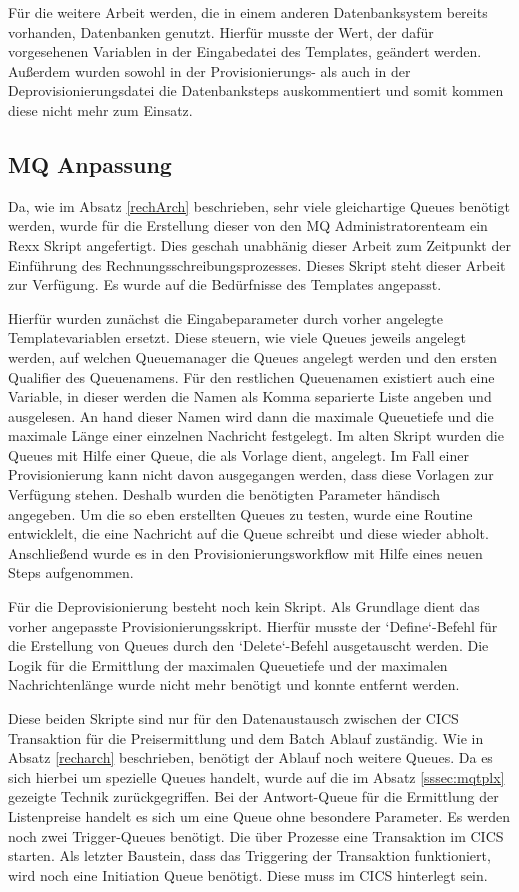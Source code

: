 Für die weitere Arbeit werden, die in einem anderen Datenbanksystem bereits vorhanden, Datenbanken genutzt.
Hierfür musste der Wert, der dafür vorgesehenen Variablen in der Eingabedatei des Templates, geändert werden.
Außerdem wurden sowohl in der Provisionierungs- als auch in der Deprovisionierungsdatei die Datenbanksteps auskommentiert und somit kommen diese nicht mehr zum Einsatz.

\subsection{MQ Anpassung}\label{ssec:mqentw}
Da, wie im Absatz \ref{rechArch} beschrieben, sehr viele gleichartige Queues benötigt werden, wurde für die Erstellung dieser von den MQ Administratorenteam ein Rexx Skript angefertigt.
Dies geschah unabhänig dieser Arbeit zum Zeitpunkt der Einführung des Rechnungsschreibungsprozesses.
Dieses Skript steht dieser Arbeit zur Verfügung.
Es wurde auf die Bedürfnisse des Templates angepasst.

Hierfür wurden zunächst die Eingabeparameter durch vorher angelegte Templatevariablen ersetzt.
Diese steuern, wie viele Queues jeweils angelegt werden, auf welchen Queuemanager die Queues angelegt werden und den ersten Qualifier des Queuenamens.
Für den restlichen Queuenamen existiert auch eine Variable, in dieser werden die Namen als Komma separierte Liste angeben und ausgelesen.
An hand dieser Namen wird dann die maximale Queuetiefe und die maximale Länge einer einzelnen Nachricht festgelegt.
Im alten Skript wurden die Queues mit Hilfe einer Queue, die als Vorlage dient, angelegt.
Im Fall einer Provisionierung kann nicht davon ausgegangen werden, dass diese Vorlagen zur Verfügung stehen.
Deshalb wurden die benötigten Parameter händisch angegeben.
Um die so eben erstellten Queues zu testen, wurde eine Routine entwicklelt, die eine Nachricht auf die Queue schreibt und diese wieder abholt.
Anschließend wurde es in den Provisionierungsworkflow mit Hilfe eines neuen Steps aufgenommen.

Für die Deprovisionierung besteht noch kein Skript.
Als Grundlage dient das vorher angepasste Provisionierungsskript.
Hierfür musste der `Define`-Befehl für die Erstellung von Queues durch den `Delete`-Befehl ausgetauscht werden.
Die Logik für die Ermittlung der maximalen Queuetiefe und der maximalen Nachrichtenlänge wurde nicht mehr benötigt und konnte entfernt werden.

Diese beiden Skripte sind nur für den Datenaustausch zwischen der CICS Transaktion für die Preisermittlung und dem Batch Ablauf zuständig.
Wie in Absatz \ref{recharch} beschrieben, benötigt der Ablauf noch weitere Queues.
Da es sich hierbei um spezielle Queues handelt, wurde auf die im Absatz \ref{sssec:mqtplx} gezeigte Technik zurückgegriffen.
Bei der Antwort-Queue für die Ermittlung der Listenpreise handelt es sich um eine Queue ohne besondere Parameter.
Es werden noch zwei Trigger-Queues benötigt.
Die über Prozesse eine Transaktion im CICS starten.
Als letzter Baustein, dass das Triggering der Transaktion funktioniert, wird noch eine Initiation Queue benötigt.
Diese muss im CICS hinterlegt sein.

